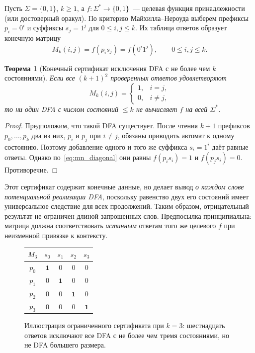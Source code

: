 \documentclass[11pt,a4paper]{article}
\newtheorem{theorem}{Теорема}[section]
\begin{document}
Пусть $\Sigma=\{0,1\}$, $k\ge1$, а $f:\Sigma^*\to\{0,1\}$~--- целевая функция принадлежности (или достоверный оракул). По критерию Майхилла--Нероуда \cite{myhill1957,nerode1958} выберем префиксы $p_i=0^i$ и суффиксы $s_j=1^j$ для $0\le i,j\le k$. Их таблица ответов образует конечную матрицу
\begin{equation}\label{eq:mn_matrix}
M_k(i,j)=f(p_is_j)=f(0^i1^j),\qquad 0\le i,j\le k.
\end{equation}
\begin{theorem}[Конечный сертификат исключения DFA с не более чем $k$ состояниями]\label{thm:bounded_dfa}
Если все $(k+1)^2$ проверенных ответов удовлетворяют
\begin{equation}\label{eq:mn_diagonal}
M_k(i,j)=\begin{cases}1,&i=j,\\0,&i\ne j,\end{cases}
\end{equation}
то \emph{ни один} DFA с числом состояний $\le k$ не вычисляет $f$ на всей $\Sigma^*$.
\end{theorem}
\begin{proof}
Предположим, что такой DFA существует. После чтения $k+1$ префиксов $p_0,\ldots,p_k$ два из них, $p_i$ и $p_j$ при $i\ne j$, обязаны приводить автомат к одному состоянию. Поэтому добавление одного и того же суффикса $s_i=1^i$ даёт равные ответы. Однако по~\eqref{eq:mn_diagonal} они равны $f(p_is_i)=1$ и $f(p_js_i)=0$. Противоречие.
\end{proof}

Этот сертификат содержит конечные данные, но делает вывод \emph{о каждом слове потенциальной реализации DFA}, поскольку равенство двух его состояний имеет универсальное следствие для всех продолжений. Таким образом, отрицательный результат не ограничен длиной запрошенных слов. Предпосылка принципиальна: матрица должна соответствовать \emph{истинным} ответам того же целевого $f$ при неизменной привязке к контексту.

\begin{figure}[htbp]
\centering
\begin{tabular}{c|cccc}
$M_3$ & $s_0$ & $s_1$ & $s_2$ & $s_3$\\ \hline
$p_0$ & $\mathbf 1$ & 0 & 0 & 0\\
$p_1$ & 0 & $\mathbf 1$ & 0 & 0\\
$p_2$ & 0 & 0 & $\mathbf 1$ & 0\\
$p_3$ & 0 & 0 & 0 & $\mathbf 1$
\end{tabular}
\caption{Иллюстрация ограниченного сертификата при $k=3$: шестнадцать ответов исключают все DFA с не более чем тремя состояниями, но не DFA большего размера.}\label{fig:matrix}
\end{figure}
\end{document}
